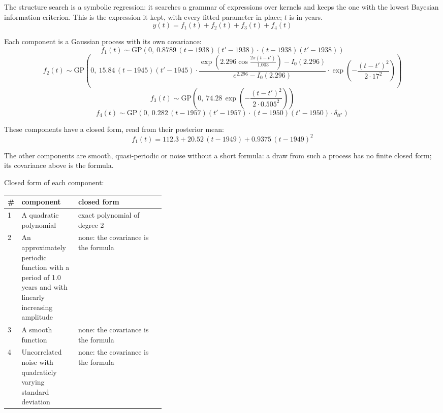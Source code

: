 \documentclass[11pt,a4paper]{article}
\begin{document}
The structure search is a symbolic regression: it searches a grammar of expressions over kernels and keeps the one with the lowest Bayesian information criterion. This is the expression it kept, with every fitted parameter in place; $t$ is in years.
\begin{dmath*}
y(t) = f_{1}(t) + f_{2}(t) + f_{3}(t) + f_{4}(t)
\end{dmath*}

Each component is a Gaussian process with its own covariance:
\begin{dmath*}
f_{1}(t) \sim \mathrm{GP}\!\left(0,\ 0.8789\,(t - 1938)(t' - 1938) \cdot (t - 1938)(t' - 1938)\right)
\end{dmath*}
\begin{dmath*}
f_{2}(t) \sim \mathrm{GP}\!\left(0,\ 15.84\,(t - 1945)(t' - 1945) \cdot \frac{\exp\!\left(2.296\cos\frac{2\pi (t - t')}{1.003}\right) - I_0(2.296)}{e^{2.296} - I_0(2.296)} \cdot \exp\!\left(-\frac{(t - t')^2}{2 \cdot 17^2}\right)\right)
\end{dmath*}
\begin{dmath*}
f_{3}(t) \sim \mathrm{GP}\!\left(0,\ 74.28\,\exp\!\left(-\frac{(t - t')^2}{2 \cdot 0.505^2}\right)\right)
\end{dmath*}
\begin{dmath*}
f_{4}(t) \sim \mathrm{GP}\!\left(0,\ 0.282\,(t - 1957)(t' - 1957) \cdot (t - 1950)(t' - 1950) \cdot \delta_{t t'}\right)
\end{dmath*}

These components have a closed form, read from their posterior mean:
\begin{dmath*}
f_{1}(t) = 112.3 + 20.52\,(t - 1949) + 0.9375\,(t - 1949)^{2}
\end{dmath*}

The other components are smooth, quasi-periodic or noise without a short formula: a draw from such a process has no finite closed form; its covariance above is the formula.

Closed form of each component:

\begin{center}\footnotesize
\begin{tabular}{lp{0.36\linewidth}l}
\toprule
\# & component & closed form \\
\midrule
1 & A quadratic polynomial & exact polynomial of degree 2 \\
2 & An approximately periodic function with a period of 1.0 years and with linearly increasing amplitude & none: the covariance is the formula \\
3 & A smooth function & none: the covariance is the formula \\
4 & Uncorrelated noise with quadraticly varying standard deviation & none: the covariance is the formula \\
\bottomrule
\end{tabular}
\end{center}
\end{document}
